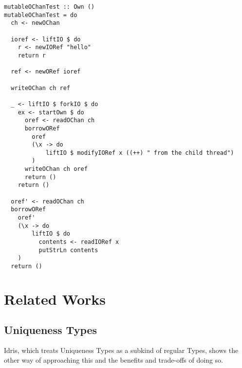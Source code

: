 \documentclass[onehalf,11pt]{beavtex}
\begin{document}
\begin{verbatim}
mutableOChanTest :: Own ()
mutableOChanTest = do
  ch <- newOChan

  ioref <- liftIO $ do
    r <- newIORef "hello"
    return r

  ref <- newORef ioref

  writeOChan ch ref

  _ <- liftIO $ forkIO $ do
    ex <- startOwn $ do
      oref <- readOChan ch
      borrowORef
        oref
        (\x -> do
            liftIO $ modifyIORef x ((++) " from the child thread")
        )
      writeOChan ch oref
      return ()
    return ()

  oref' <- readOChan ch
  borrowORef
    oref'
    (\x -> do
        liftIO $ do
          contents <- readIORef x
          putStrLn contents
    )
  return ()
\end{verbatim}







\chapter{Related Works}

\section{Uniqueness Types}

Idris, which treats Uniqueness Types as a subkind of regular Types, shows
the other way of approaching this and the benefits and trade-offs of doing so.
\end{document}
